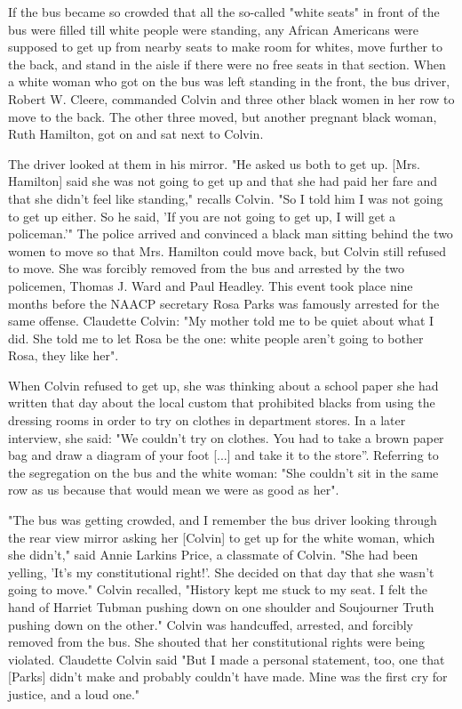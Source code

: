 If the bus became so crowded that all the so-called "white seats" in
front of the bus were filled till white people were standing, any
African Americans were supposed to get up from nearby seats to make room
for whites, move further to the back, and stand in the aisle if there
were no free seats in that section. When a white woman who got on the
bus was left standing in the front, the bus driver, Robert W. Cleere,
commanded Colvin and three other black women in her row to move to the
back. The other three moved, but another pregnant black woman, Ruth
Hamilton, got on and sat next to Colvin.

The driver looked at them in his mirror. "He asked us both to get up.
{[}Mrs. Hamilton{]} said she was not going to get up and that she had
paid her fare and that she didn't feel like standing," recalls Colvin.
"So I told him I was not going to get up either. So he said, 'If you are
not going to get up, I will get a policeman.'" The police arrived and
convinced a black man sitting behind the two women to move so that Mrs.
Hamilton could move back, but Colvin still refused to move. She was
forcibly removed from the bus and arrested by the two policemen, Thomas
J. Ward and Paul Headley. This event took place nine months before the
NAACP secretary Rosa Parks was famously arrested for the same offense.
Claudette Colvin: "My mother told me to be quiet about what I did. She
told me to let Rosa be the one: white people aren't going to bother
Rosa, they like her".

When Colvin refused to get up, she was thinking about a school paper she
had written that day about the local custom that prohibited blacks from
using the dressing rooms in order to try on clothes in department
stores. In a later interview, she said: "We couldn't try on clothes. You
had to take a brown paper bag and draw a diagram of your foot {[}...{]}
and take it to the store''. Referring to the segregation on the bus and
the white woman: "She couldn't sit in the same row as us because that
would mean we were as good as her".

"The bus was getting crowded, and I remember the bus driver looking
through the rear view mirror asking her {[}Colvin{]} to get up for the
white woman, which she didn't," said Annie Larkins Price, a classmate of
Colvin. "She had been yelling, 'It's my constitutional right!'. She
decided on that day that she wasn't going to move." Colvin recalled,
"History kept me stuck to my seat. I felt the hand of Harriet Tubman
pushing down on one shoulder and Soujourner Truth pushing down on the
other." Colvin was handcuffed, arrested, and forcibly removed from the
bus. She shouted that her constitutional rights were being violated.
Claudette Colvin said "But I made a personal statement, too, one that
{[}Parks{]} didn't make and probably couldn't have made. Mine was the
first cry for justice, and a loud one."

